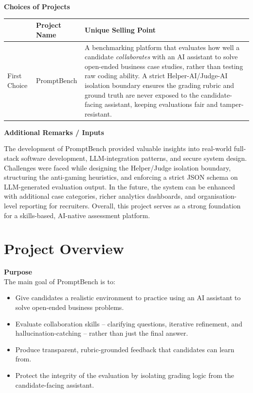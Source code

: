 \documentclass[12pt,a4paper]{report}
\begin{document}
\textbf{Choices of Projects}

\begin{center}
\renewcommand{\arraystretch}{1.5}
\begin{tabular}{|p{2.3cm}|p{3.2cm}|p{8.5cm}|}
\hline
\textbf{} & \textbf{Project Name} & \textbf{Unique Selling Point} \\
\hline
First Choice & PromptBench & A benchmarking platform that evaluates how well a candidate
\emph{collaborates} with an AI assistant to solve open-ended business case studies, rather than
testing raw coding ability. A strict Helper-AI/Judge-AI isolation boundary ensures the grading
rubric and ground truth are never exposed to the candidate-facing assistant, keeping evaluations
fair and tamper-resistant. \\
\hline
\end{tabular}
\end{center}

\textbf{Additional Remarks / Inputs}

The development of PromptBench provided valuable insights into real-world full-stack software
development, LLM-integration patterns, and secure system design. Challenges were faced while
designing the Helper/Judge isolation boundary, structuring the anti-gaming heuristics, and
enforcing a strict JSON schema on LLM-generated evaluation output. In the future, the system can
be enhanced with additional case categories, richer analytics dashboards, and organisation-level
reporting for recruiters. Overall, this project serves as a strong foundation for a
skills-based, AI-native assessment platform.

\section{Project Overview}

\textbf{Purpose}\\
The main goal of PromptBench is to:
\begin{itemize}[nosep]
    \item Give candidates a realistic environment to practice using an AI assistant to solve
    open-ended business problems.
    \item Evaluate collaboration skills -- clarifying questions, iterative refinement, and
    hallucination-catching -- rather than just the final answer.
    \item Produce transparent, rubric-grounded feedback that candidates can learn from.
    \item Protect the integrity of the evaluation by isolating grading logic from the
    candidate-facing assistant.
\end{itemize}
\end{document}
